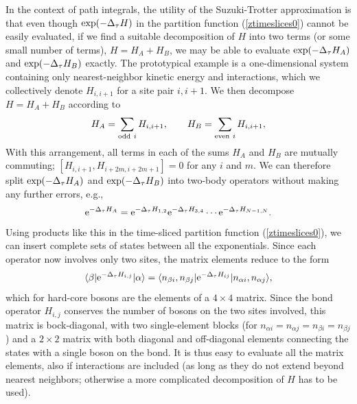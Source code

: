 \documentclass[draft,numberedheadings]{aipproc}
\begin{document}
In the context of path integrals, the utility of the Suzuki-Trotter approximation is that even though ${\rm exp}{(-\Delta_\tau H)}$ in the partition function 
(\ref{ztimeslices0}) cannot be easily evaluated, if we find a suitable decomposition of $H$ into two terms (or some small number of terms), $H=H_A+H_B$, 
we may be able to evaluate ${\rm exp}{(-\Delta_\tau H_A)}$ and ${\rm exp}{(-\Delta_\tau H_B)}$ exactly. The prototypical example is a one-dimensional system containing 
only nearest-neighbor kinetic energy and interactions, which we collectively denote $H_{i,i+1}$ for a site pair $i,i+1$. We then decompose $H=H_A+H_B$ according to
\begin{equation}
H_A=\sum_{{\rm odd~} i}H_{i,i+1},~~~~~~H_B=\sum_{{\rm even~} i}H_{i,i+1},
\label{hahbdecomp}
\end{equation}
With this arrangement, all terms in each of the sums $H_A$ and $H_B$ are mutually commuting; $[H_{i,i+1},H_{i+2m,i+2m+1}]=0$ for any $i$ and $m$. We can 
therefore split ${\rm exp}{(-\Delta_\tau H_A)}$ and ${\rm exp}{(-\Delta_\tau H_B)}$ into two-body operators without making any further errors, e.g.,
\begin{equation}
{\rm e}^{-\Delta_\tau H_A} = {\rm e}^{-\Delta_\tau H_{1,2}} {\rm e}^{-\Delta_\tau H_{3,4}} \cdots {\rm e}^{-\Delta_\tau H_{N-1,N}}.
\end{equation}
Using products like this in  the time-sliced partition function (\ref{ztimeslices0}), we can insert complete sets of states between all the exponentials.
Since each operator now involves only two sites, the matrix elements reduce to the form
\begin{equation}
\langle \beta|{\rm e}^{-\Delta_\tau H_{i,j}}|\alpha\rangle = \langle n_{\beta i},n_{\beta j}|{\rm e}^{-\Delta_\tau H_{ij}}|n_{\alpha i},n_{\alpha j}\rangle,
\label{sliceelements}
\end{equation}
which for hard-core bosons are the elements of a $4\times 4$ matrix. Since the bond operator $H_{i,j}$ conserves the number of bosons on the two sites involved, 
this matrix is bock-diagonal, with two single-element blocks (for $n_{\alpha i}=n_{\alpha j}=n_{\beta i}=n_{\beta j}$) and a $2\times 2$ matrix with both diagonal
and off-diagonal elements connecting the states with a single boson on the bond. It is thus easy to evaluate all the matrix elements, also if interactions are 
included (as long as they do not extend beyond nearest neighbors; otherwise a more complicated decomposition of $H$ has to be used).
\end{document}
